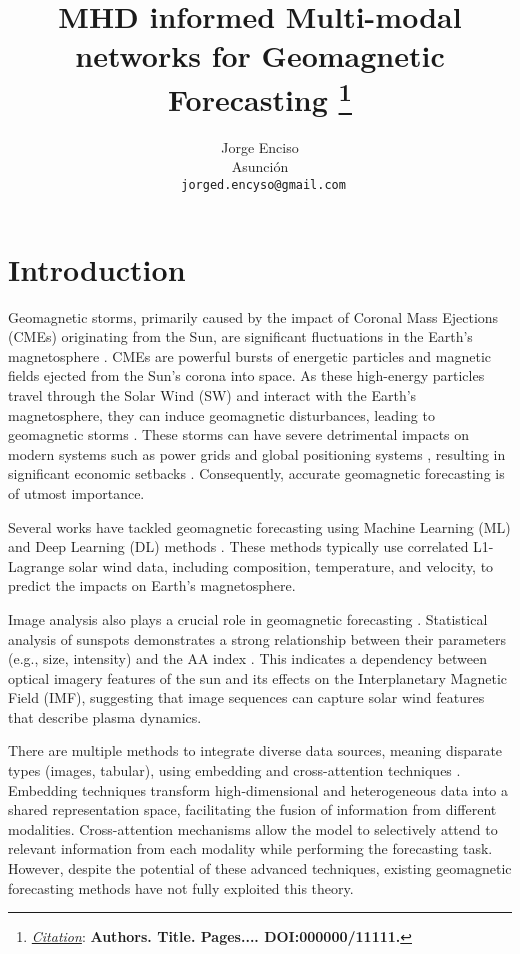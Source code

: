 \documentclass{article}
\title{MHD informed Multi-modal networks for Geomagnetic Forecasting
\thanks{\textit{\underline{Citation}}:
\textbf{Authors. Title. Pages.... DOI:000000/11111.}}
}
\author{
  Jorge Enciso \\
  Asunción\\
  \texttt{\ jorged.encyso@gmail.com} \\
}
\begin{document}
\maketitle


\begin{abstract}

\end{abstract}



\section{Introduction}

Geomagnetic storms, primarily caused by the impact of Coronal Mass Ejections (CMEs) originating from the Sun, are significant fluctuations in the Earth's magnetosphere \cite{comp_1}. CMEs are powerful bursts of energetic particles and magnetic fields ejected from the Sun's corona into space. As these high-energy particles travel through the Solar Wind (SW) and interact with the Earth's magnetosphere, they can induce geomagnetic disturbances, leading to geomagnetic storms \cite{ECHER20111454, cme_pred_1, cme_pred_2}. These storms can have severe detrimental impacts on modern systems such as power grids \cite{power_grid, var_study_1} and global positioning systems \cite{gps_1}, resulting in significant economic setbacks \cite{comp_1}. Consequently, accurate geomagnetic forecasting is of utmost importance.

Several works have tackled geomagnetic forecasting using Machine Learning (ML) and Deep Learning (DL) methods \cite{comp_1, comp_2, comp_3, comp_4}. These methods typically use correlated L1-Lagrange solar wind data, including composition, temperature, and velocity, to predict the impacts on Earth's magnetosphere.

Image analysis also plays a crucial role in geomagnetic forecasting \cite{cme_pred_1, cme_pred_2, image_1}. Statistical analysis of sunspots demonstrates a strong relationship between their parameters (e.g., size, intensity) and the AA index \cite{image_1}. This indicates a dependency between optical imagery features of the sun and its effects on the Interplanetary Magnetic Field (IMF), suggesting that image sequences can capture solar wind features that describe plasma dynamics.

There are multiple methods to integrate diverse data sources, meaning disparate types (images, tabular), using embedding and cross-attention techniques \cite{multimodal1}. Embedding techniques transform high-dimensional and heterogeneous data into a shared representation space, facilitating the fusion of information from different modalities. Cross-attention mechanisms allow the model to selectively attend to relevant information from each modality while performing the forecasting task. However, despite the potential of these advanced techniques, existing geomagnetic forecasting methods have not fully exploited this theory.
\end{document}
